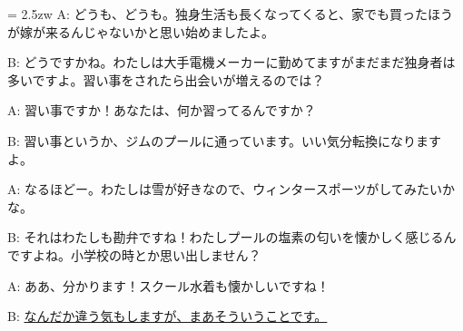 \documentclass[11pt]{amsart}
\title{}
\author{}
\newenvironment{hangall}[1]{\hangindent = 2.5zw\everypar{\hangindent = 2.5zw}}{}
\begin{document}
\maketitle
\begin{hangall}{}%
A: どうも、どうも。独身生活も長くなってくると、家でも買ったほうが嫁が来るんじゃないかと思い始めましたよ。

B: どうですかね。わたしは大手電機メーカーに勤めてますがまだまだ独身者は多いですよ。習い事をされたら出会いが増えるのでは？

A: 習い事ですか！あなたは、何か習ってるんですか？

B: 習い事というか、ジムのプールに通っています。いい気分転換になりますよ。

A: なるほどー。わたしは雪が好きなので、ウィンタースポーツがしてみたいかな。

B: それはわたしも勘弁ですね！わたしプールの塩素の匂いを懐かしく感じるんですよね。小学校の時とか思い出しません？

A: ああ、分かります！スクール水着も懐かしいですね！

B: \ul{なんだか違う気もしますが、まあそういうことです。}\end{hangall}
\end{document}
